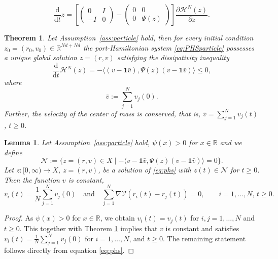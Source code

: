 \documentclass[10pt,a4paper]{amsart}
\newtheorem{theorem}{Theorem}
\newtheorem{lemma}{Lemma}
\newcommand{\R}[0]{\mathbb R}
\newcommand{\calH}[0]{\mathcal H}
\newcommand{\dd}[0]{\mathrm d}
\newcommand{\sumj}[0]{\sum_{j=1}^N}
\begin{document}
\begin{equation}\label{eq:PHSparticle}
\frac{\dd}{\dd t} z = \left[ \begin{pmatrix} 0 & I \\ -I & 0 \end{pmatrix} - \begin{pmatrix} 0 & 0 \\ 0 & \Psi(z) \end{pmatrix} \right] \frac{\partial \calH^N(z)}{\partial z}. 
\end{equation}

\begin{theorem}\label{thm:existencenew}
Let Assumption~\ref{ass:particle}  hold, then for every initial condition $z_0=(r_0,v_0)\in \R^{Nd+Nd}$ the port-Hamiltonian system \eqref{eq:PHSparticle} possesses a unique global solution $z=(r,v)$ satisfying the dissipativity inequality
\begin{equation}\label{eqn:dissipnew}
\frac{\dd}{\dd t} \calH^N(z)= - \langle (v - \textbf{1}\bar v), \Psi(z) (v-\textbf{1}\bar v) \rangle \le 0,
\end{equation}
where 
\begin{equation*}
  \bar v:=\sum_{j=1}^N v_j(0). 
\end{equation*}
Further, the velocity of the center of mass is conserved, that is,
 $ \bar v=\sum_{j=1}^N v_j(t)$, $t\ge 0$. 
\end{theorem}

\begin{lemma}\label{lem:invariantnew}
Let Assumption~\ref{ass:particle} hold, $\psi(x)>0$  for $x\in\R$ and we define 
 \[ \mathcal N:= \{z=(r,v)\in X\mid  - \langle v - \mathbf{1}\bar v, \Psi(z)( v - \mathbf{1}\bar v )\rangle = 0\}. \]
 Let $z:[0,\infty)\rightarrow X$, $z=(r,v)$, be a solution of \eqref{eq:phs} with $z(t)\in \mathcal N$ for $t\ge 0$. Then the function $v$ is constant,
 \[  v_i(t)=\frac{1}{N}\sumj v_j(0)\quad\text{and}\quad \sumj \nabla \mathcal V(r_ i(t) - r_j(t))=0, \qquad i=1,\ldots, N, \, t\ge 0.\]
\end{lemma}

\begin{proof}
 As $\psi(x)>0$  for $x\in\R$,  we obtain $ v_i(t)=v_j(t)$ for  $i,j=1, \ldots, N$ and $t\ge 0$. This together with Theorem \ref{thm:existencenew} implies that $v$ is constant and satisfies $v_i(t)=\frac{1}{N}\sumj v_j(0)$ for $ i=1,\ldots, N$, and $t\ge 0$. The remaining statement follows directly from equation \eqref{eq:phs}. 
\end{proof}
\end{document}
